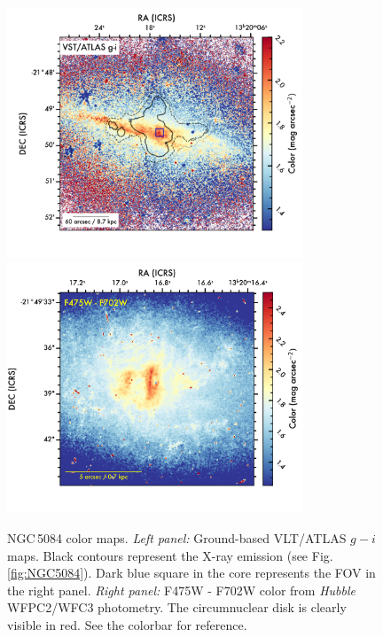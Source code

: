 \documentclass[modern]{CORE-AAS/aastex631}
\begin{document}
{\begin{figure}[t!]
\begin{center}
\includegraphics[trim={0 20 40 0}, clip,  height = 7.5cm]{FIGURES/NGC5084_gi.png}
\includegraphics[trim={30 20 0 0}, clip,  height = 7.5cm]{FIGURES/NGC5084_F475W_F702W.png}
\caption{NGC\,5084 color maps. \emph{Left panel:} Ground-based VLT/ATLAS $g-i$ maps. Black contours represent the X-ray emission (see Fig.\,\ref{fig:NGC5084}). Dark blue square in the core represents the FOV in the right panel. \emph{Right panel:} F475W - F702W color from \emph{Hubble} WFPC2/WFC3 photometry. The circumnuclear disk is clearly visible in red. See the colorbar for reference.} 
\label{fig:NGC5084_color}
\end{center}
\end{figure}

}
\end{document}
